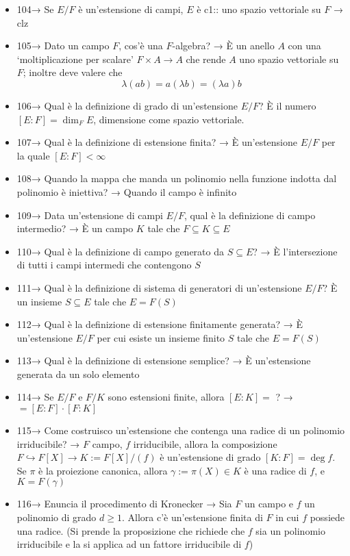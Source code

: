 \documentclass[A4,12pt]{article}
\renewcommand{\subset}{\subseteq}
\begin{document}
\begin{itemize}[noitemsep]
		\item 104→ Se $ E/F $ è un'estensione di campi, $ E $ è {{c1:: uno spazio vettoriale su }} $ F $ → clz
		\item 105→ Dato un campo $ F $, cos'è una $ F $-algebra? → È un anello $ A $ con una \enquote*{moltiplicazione per scalare} $ F\times A\to A $ che rende $ A $ uno spazio vettoriale su $ F $; inoltre deve valere che \[\lambda(ab)=a(\lambda b) = (\lambda a)b\]
		\item 106→ Qual è la definizione di grado di un'estensione $ E/F $? È il numero $ [E:F] = \dim_F E$, dimensione come spazio vettoriale.
		\item 107→ Qual è la definizione di estensione finita? → È un'estensione $ E/F $ per la quale $ [E:F]<\infty$
		\item 108→ Quando la mappa che manda un polinomio nella funzione indotta dal polinomio è iniettiva? → Quando il campo è infinito
		\item 109→ Data un'estensione di campi $ E/F $, qual è la definizione di campo intermedio? → È un campo $ K $ tale che $ F\subset K\subset E $
		\item 110→ Qual è la definizione di campo generato da $ S\subset E $? → È l'intersezione di tutti i campi intermedi che contengono $ S $
		\item 111→ Qual è la definizione di sistema di generatori di un'estensione $ E/F $? È un insieme $ S\subset E $ tale che $ E = F(S)$
		\item 112→ Qual è la definizione di estensione finitamente generata? → È un'estensione $ E/F $ per cui esiste un insieme finito $ S $ tale che $ E=F(S) $
		\item 113→ Qual è la definizione di estensione semplice? → È un'estensione generata da un solo elemento
		\item 114→ Se $ E/F $ e $ F/K $ sono estensioni finite, allora $ [E:K] =  $ ? → $ = [E:F]\cdot [F:K] $
		\item 115→ Come costruisco un'estensione che contenga una radice di un polinomio irriducibile? → $ F $ campo, $ f $ irriducibile, allora la composizione $ F\hookrightarrow F[X] \to K:=F[X]/(f)$ è un'estensione di grado $ [K:F] = \deg f $. Se $ \pi $ è la proiezione canonica, allora $ \gamma:= \pi(X)\in K $ è una radice di $ f $, e $ K=F(\gamma) $
		\item 116→ Enuncia il procedimento di Kronecker → Sia $ F $ un campo e $ f $ un polinomio di grado $ d\geq 1 $. Allora c'è un'estensione finita di $ F $ in cui $ f $ possiede una radice. (Si prende la proposizione che richiede che $ f $ sia un polinomio irriducibile e la si applica ad un fattore irriducibile di $ f $) 

\end{itemize}
\end{document}
